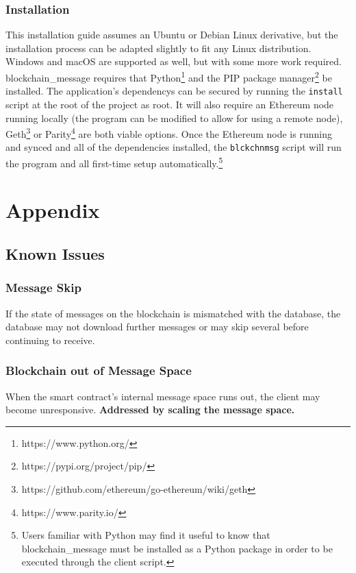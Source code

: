 \documentclass[titlepage]{report}
\begin{document}
\subsection{Installation}
This installation guide assumes an Ubuntu or Debian Linux derivative, but the installation process can be adapted slightly to fit any Linux distribution. Windows and macOS are supported as well, but with some more work required. blockchain\_message requires that Python\footnote{https://www.python.org/} and the PIP package manager\footnote{https://pypi.org/project/pip/} be installed. The application's \glspl{dependency} can be secured by running the \texttt{install} script at the root of the project as root. It will also require an \gls{Ethereum} \gls{node} running locally (the program can be modified to allow for using a remote \gls{node}), Geth\footnote{https://github.com/ethereum/go-ethereum/wiki/geth} or Parity\footnote{https://www.parity.io/} are both viable options. Once the Ethereum \gls{node} is running and \gls{synced} and all of the dependencies installed, the \texttt{blckchnmsg} script will run the program and all first-time setup automatically.\footnote{Users familiar with Python may find it useful to know that blockchain\_message must be installed as a Python package in order to be executed through the client script.}

\pagebreak
\chapter{Appendix}

\section{Known Issues}
\subsection{Message Skip}
If the state of messages on the \gls{blockchain} is mismatched with the database, the database may not download further messages or may skip several before continuing to receive.
\subsection{Blockchain out of Message Space}
When the smart contract's internal message space runs out, the client may become unresponsive. \textbf{Addressed by scaling the message space.}
\end{document}
